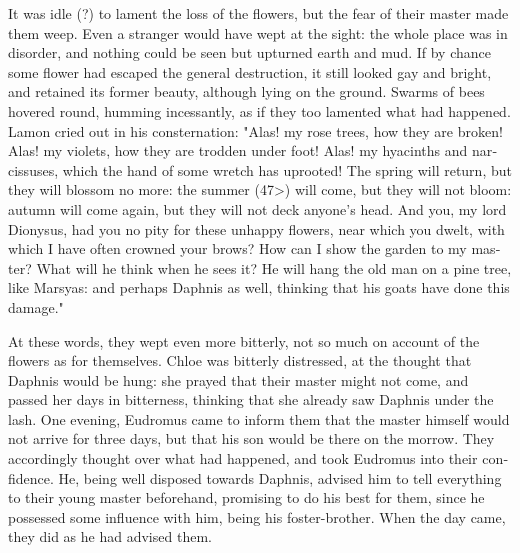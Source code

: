 \documentclass{book}
\begin{document}
\begin{pairs}
\begin{Rightside}
\begin{english}
  It was idle (?) to lament the loss of the flowers, but the fear of their master made them weep.  Even a stranger would have wept at the sight: the whole place was in disorder, and nothing could be seen but upturned earth and mud.  If by chance some flower had escaped the general destruction, it still looked gay and bright, and retained its former beauty, although lying on the ground.  Swarms of bees hovered round, humming incessantly, as if they too lamented what had happened.  Lamon cried out in his consternation: "Alas! my rose trees, how they are broken!  Alas! my violets, how they are trodden under foot!  Alas! my hyacinths and narcissuses, which the hand of some wretch has uprooted!  The spring will return, but they will blossom no more: the summer (47>) will come, but they will not bloom: autumn will come again, but they will not deck anyone's head.  And you, my lord Dionysus, had you no pity for these unhappy flowers, near which you dwelt, with which I have often crowned your brows?  How can I show the garden to my master?  What will he think when he sees it?  He will hang the old man on a pine tree, like Marsyas: and perhaps Daphnis as well, thinking that his goats have done this damage."
\pend


  At these words, they wept even more bitterly, not so much on account of the flowers as for themselves.  Chloe was bitterly distressed, at the thought that Daphnis would be hung: she prayed that their master might not come, and passed her days in bitterness, thinking that she already saw Daphnis under the lash.  One evening, Eudromus came to inform them that the master himself would not arrive for three days, but that his son would be there on the morrow.  They accordingly thought over what had happened, and took Eudromus into their confidence.  He, being well disposed towards Daphnis, advised him to tell everything to their young master beforehand, promising to do his best for them, since he possessed some influence with him, being his foster-brother.  When the day came, they did as he had advised them.
\pend



\end{english}
\end{Rightside}
\end{pairs}
\end{document}
